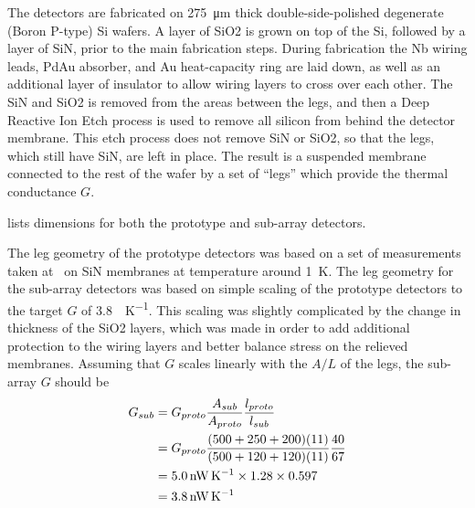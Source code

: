 The detectors are fabricated on \SI{275}{\um} thick double-side-polished degenerate (Boron P-type) Si wafers.
A layer of SiO2 is grown on top of the Si, followed by a layer of SiN, prior to the main fabrication steps.
During fabrication the Nb wiring leads, PdAu absorber, and Au heat-capacity ring are laid down, as well as an additional layer of insulator to allow wiring layers to cross over each other.
The SiN and SiO2 is removed from the areas between the legs, and then a Deep Reactive Ion Etch process is used to remove all silicon from behind the detector membrane.
This etch process does not remove SiN or SiO2, so that the legs, which still have SiN, are left in place.
The result is a suspended membrane connected to the rest of the wafer by a set of ``legs'' which provide the thermal conductance $G$.

 lists dimensions for both the prototype and sub-array detectors.


The leg geometry of the prototype detectors was based on a set of measurements taken at \NIST\ on SiN membranes at temperature around \SI{1}{\K}.
The leg geometry for the sub-array detectors was based on simple scaling of the prototype detectors to the target $G$ of \SI{3.8}{\nW\per\K}.
This scaling was slightly complicated by the change in thickness of the SiO2 layers, which was made in order to add additional protection to the wiring layers and better balance stress on the relieved membranes.
Assuming that $G$ scales linearly with the $A/L$ of the legs, the sub-array $G$ should be
\begin{align}
  G_{sub} & = G_{proto} \frac{A_{sub}}{A_{proto}} \frac{l_{proto}}{l_{sub}} \\
         & = G_{proto} \frac{(500 + 250 + 200)(11)}{(500 + 120 + 120)(11)} \frac{40}{67} \\
         & = \SI{5.0}{\nW\per\K} \times 1.28 \times 0.597 \\
         & = \SI{3.8}{\nW\per\K} 
\end{align}

